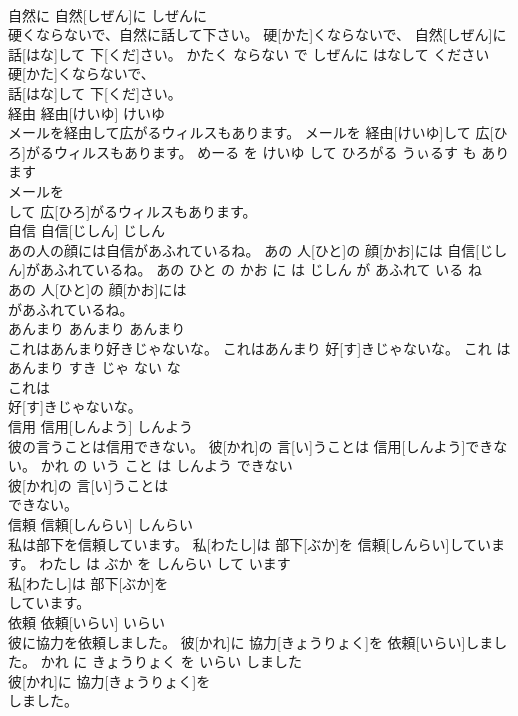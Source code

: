 \documentclass[8pt]{extreport}
\begin{document}
\begin{CJK}{UTF8}{min}
\\	自然に	自然[しぜん]に	しぜんに	
\\	硬くならないで、自然に話して下さい。	硬[かた]くならないで、 自然[しぜん]に 話[はな]して 下[くだ]さい。	かたく ならない で しぜんに はなして ください	
\\	硬[かた]くならないで、
\\	話[はな]して 下[くだ]さい。			
\\	経由	経由[けいゆ]	けいゆ	
\\	メールを経由して広がるウィルスもあります。	メールを 経由[けいゆ]して 広[ひろ]がるウィルスもあります。	めーる を けいゆ して ひろがる うぃるす も あります	
\\	メールを
\\	して 広[ひろ]がるウィルスもあります。			
\\	自信	自信[じしん]	じしん	
\\	あの人の顔には自信があふれているね。	あの 人[ひと]の 顔[かお]には 自信[じしん]があふれているね。	あの ひと の かお に は じしん が あふれて いる ね	
\\	あの 人[ひと]の 顔[かお]には
\\	があふれているね。			
\\	あんまり	あんまり	あんまり	
\\	これはあんまり好きじゃないな。	これはあんまり 好[す]きじゃないな。	これ は あんまり すき じゃ ない な	
\\	これは
\\	好[す]きじゃないな。			
\\	信用	信用[しんよう]	しんよう	
\\	彼の言うことは信用できない。	彼[かれ]の 言[い]うことは 信用[しんよう]できない。	かれ の いう こと は しんよう できない	
\\	彼[かれ]の 言[い]うことは
\\	できない。			
\\	信頼	信頼[しんらい]	しんらい	
\\	私は部下を信頼しています。	私[わたし]は 部下[ぶか]を 信頼[しんらい]しています。	わたし は ぶか を しんらい して います	
\\	私[わたし]は 部下[ぶか]を
\\	しています。			
\\	依頼	依頼[いらい]	いらい	
\\	彼に協力を依頼しました。	彼[かれ]に 協力[きょうりょく]を 依頼[いらい]しました。	かれ に きょうりょく を いらい しました	
\\	彼[かれ]に 協力[きょうりょく]を
\\	しました。			

\end{CJK}
\end{document}
